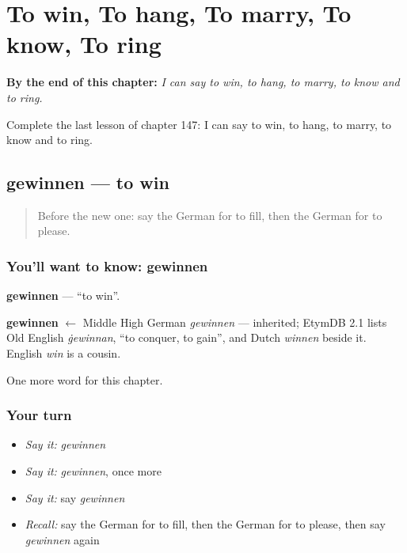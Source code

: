 
\chapter{To win, To hang, To marry, To know, To ring}
\label{ch:ge-to-win-to-hang-to-marry-to-know-to-ring}

\begin{chapteropening}
\textbf{By the end of this chapter:} \emph{I can say to win, to hang, to marry, to know and to ring.}

Complete the last lesson of chapter 147: I can say to win, to hang, to marry, to know and to ring.
\end{chapteropening}

\section[gewinnen]{gewinnen — to win}

\label{lesson:GE-C147-gewinnen}



\begin{quote}
Before the new one: say the German for to fill, then the German for to please.
\end{quote}

\subsection*{You'll want to know: gewinnen}
\textbf{gewinnen} — \textquotedblleft{}to win\textquotedblright{}.

\begin{cousinweb}
\textbf{gewinnen} $\leftarrow$ Middle High German \emph{gewinnen} — inherited; EtymDB 2.1 lists Old English \emph{ġewinnan}, \textquotedblleft{}to conquer, to gain\textquotedblright{}, and Dutch \emph{winnen} beside it. English \emph{win} is a cousin.
\end{cousinweb}

\begin{grammarlens}[title={What you've built}]
One more word for this chapter.
\end{grammarlens}

\subsection*{Your turn}
\begin{itemize}
\raggedright
  \item \emph{Say it:} \emph{gewinnen}
  \item \emph{Say it:} \emph{gewinnen}, once more
  \item \emph{Say it:} say \emph{gewinnen}
  \item \emph{Recall:} say the German for to fill, then the German for to please, then say \emph{gewinnen} again
\end{itemize}

